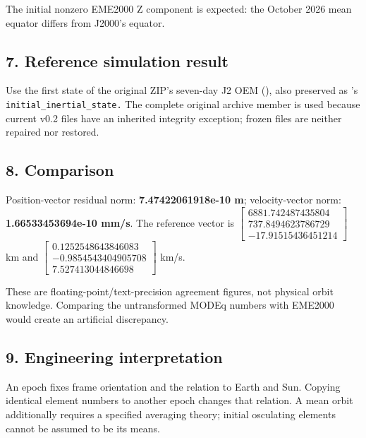\documentclass[10pt,a4paper]{article}
\numberwithin{equation}{section}
\begin{document}
\begin{sloppypar}The initial nonzero EME2000 Z component is expected: the October 2026 mean equator differs from J2000's equator.\end{sloppypar}


\subsection*{7. Reference simulation result}
\begin{sloppypar}Use the first state of the original ZIP's seven-day J2 OEM (\cite{S05}), also preserved as \cite{S03}'s \nolinkurl{initial_inertial_state.} The complete original archive member is used because current v0.2 files have an inherited integrity exception; frozen files are neither repaired nor restored.\end{sloppypar}


\subsection*{8. Comparison}

\begin{sloppypar}Position-vector residual norm: \textbf{7.47422061918e-10 m}; velocity-vector norm: \textbf{1.66533453694e-10 mm/s}. The reference vector is \(\begin{bmatrix}6881.742487435804\\737.8494623786729\\-17.91515436451214\end{bmatrix}\) km and \(\begin{bmatrix}0.1252548643846083\\-0.9854543404905708\\7.527413044846698\end{bmatrix}\) km/s.\end{sloppypar}


\begin{sloppypar}These are floating-point/text-precision agreement figures, not physical orbit knowledge. Comparing the untransformed MODEq numbers with EME2000 would create an artificial discrepancy.\end{sloppypar}


\subsection*{9. Engineering interpretation}
\begin{sloppypar}An epoch fixes frame orientation and the relation to Earth and Sun. Copying identical element numbers to another epoch changes that relation. A mean orbit additionally requires a specified averaging theory; initial osculating elements cannot be assumed to be its means.\end{sloppypar}
\end{document}

